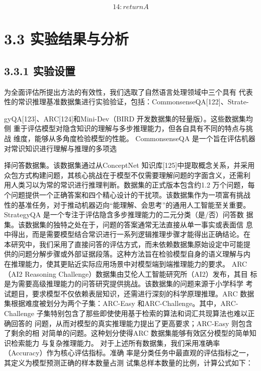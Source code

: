 \documentclass[12pt,a4paper,openright,UTF8]{ctexbook}
\begin{document}
\begin{equation*}
14: return A
\end{equation*}

\section{3.3 实验结果与分析}

\subsection{3.3.1 实验设置}

为全面评估所提出方法的有效性，我们选取了自然语言处理领域中三个具有 代表性的常识推理基准数据集进行实验验证，包括：CommonsenseQA[122]、Strate-

gyQA[123]、ARC[124]和Mini-Dev（BIRD 开发数据集的轻量版）。这些数据集均侧 重于评估模型对隐含知识的理解与多步推理能力，但各自具有不同的特点与挑战 维度，能够从多角度检验模型的性能。 CommonsenseQA 是一个旨在评估机器对常识知识进行理解与推理的多项选

择问答数据集。该数据集通过从ConceptNet 知识库[125]中提取概念关系，并采用 众包方式构建问题，其核心挑战在于模型不仅需要理解问题的字面含义，还需利 用人类习以为常的常识进行推理判断。数据集的正式版本包含约1.2 万个问题，每 个问题提供一个正确答案和四个精心设计的干扰项。该数据集作为一项富有挑战 性的基准任务，对于推动机器迈向“能理解、会思考”的通用人工智能至关重要。 StrategyQA 是一个专注于评估隐含多步推理能力的二元分类（是/否）问答数 据集。该数据集的独特之处在于，问题的答案通常无法直接从单一事实或表面信 息中得出，而是需要模型结合常识进行一系列逻辑推理步骤才能得出正确结论。在 本研究中，我们采用了直接问答的评估方式，而未依赖数据集原始设定中可能提 供的问题分解步骤或外部证据段落。这种方法旨在检验模型自身的语义理解与内 在推理能力，使其更贴近实际应用场景中对模型端到端推理能力的要求。 ARC（AI2 Reasoning Challenge）数据集由艾伦人工智能研究所（AI2）发布，其目 标是为需要高级推理能力的问答研究提供挑战。该数据集的问题来源于小学科学 考试题目，要求模型不仅依赖表层知识，还需进行深刻的科学原理推理。ARC 数据 集根据难度被划分为两个子集：ARC-Easy 和ARC-Challenge。其中，ARC-Challenge 子集特别包含了那些即使使用基于检索的算法和词汇共现算法也难以正确回答的 问题，从而对模型的真实推理能力提出了更高要求；ARC-Easy 则包含了剩余的相 对简单的问题。这种划分使得ARC 数据集能够有效区分模型的简单知识检索能力 与复杂推理能力。 对于上述所有数据集，我们采用准确率（Accuracy）作为核心评估指标。准确 率是分类任务中最直观的评估指标之一，其定义为模型预测正确的样本数量占测 试集总样本数量的比例，计算公式如下：
\end{document}
